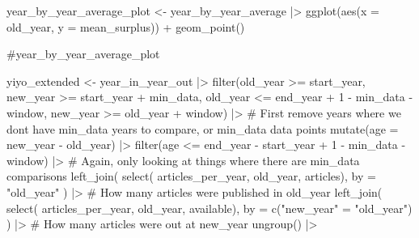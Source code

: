 \documentclass[
  10pt,
  letterpaper,
  DIV=11,
  numbers=noendperiod,
  twoside]{scrartcl}
\newenvironment{Shaded}{\begin{snugshade}}{\end{snugshade}}
\newcommand{\AttributeTok}[1]{\textcolor[rgb]{0.40,0.45,0.13}{#1}}
\newcommand{\CommentTok}[1]{\textcolor[rgb]{0.37,0.37,0.37}{#1}}
\newcommand{\DecValTok}[1]{\textcolor[rgb]{0.68,0.00,0.00}{#1}}
\newcommand{\FunctionTok}[1]{\textcolor[rgb]{0.28,0.35,0.67}{#1}}
\newcommand{\NormalTok}[1]{\textcolor[rgb]{0.00,0.23,0.31}{#1}}
\newcommand{\OtherTok}[1]{\textcolor[rgb]{0.00,0.23,0.31}{#1}}
\newcommand{\SpecialCharTok}[1]{\textcolor[rgb]{0.37,0.37,0.37}{#1}}
\newcommand{\StringTok}[1]{\textcolor[rgb]{0.13,0.47,0.30}{#1}}
\begin{document}
\begin{Shaded}
\begin{Highlighting}[]
\NormalTok{year\_by\_year\_average\_plot }\OtherTok{\textless{}{-}}\NormalTok{ year\_by\_year\_average }\SpecialCharTok{|\textgreater{}}
  \FunctionTok{ggplot}\NormalTok{(}\FunctionTok{aes}\NormalTok{(}\AttributeTok{x =}\NormalTok{ old\_year, }\AttributeTok{y =}\NormalTok{ mean\_surplus)) }\SpecialCharTok{+}
  \FunctionTok{geom\_point}\NormalTok{()}

\CommentTok{\#year\_by\_year\_average\_plot}

\NormalTok{yiyo\_extended }\OtherTok{\textless{}{-}}\NormalTok{ year\_in\_year\_out }\SpecialCharTok{|\textgreater{}}
  \FunctionTok{filter}\NormalTok{(old\_year }\SpecialCharTok{\textgreater{}=}\NormalTok{ start\_year,}
\NormalTok{         new\_year }\SpecialCharTok{\textgreater{}=}\NormalTok{ start\_year }\SpecialCharTok{+}\NormalTok{ min\_data,}
\NormalTok{         old\_year }\SpecialCharTok{\textless{}=}\NormalTok{ end\_year }\SpecialCharTok{+} \DecValTok{1} \SpecialCharTok{{-}}\NormalTok{ min\_data }\SpecialCharTok{{-}}\NormalTok{ window,}
\NormalTok{         new\_year }\SpecialCharTok{\textgreater{}=}\NormalTok{ old\_year }\SpecialCharTok{+}\NormalTok{ window) }\SpecialCharTok{|\textgreater{}} \CommentTok{\# First remove years where we don\textquotesingle{}t have min\_data years to compare, or min\_data data points}
  \FunctionTok{mutate}\NormalTok{(}\AttributeTok{age =}\NormalTok{ new\_year }\SpecialCharTok{{-}}\NormalTok{ old\_year) }\SpecialCharTok{|\textgreater{}}
  \FunctionTok{filter}\NormalTok{(age }\SpecialCharTok{\textless{}=}\NormalTok{ end\_year }\SpecialCharTok{{-}}\NormalTok{ start\_year }\SpecialCharTok{+} \DecValTok{1} \SpecialCharTok{{-}}\NormalTok{ min\_data }\SpecialCharTok{{-}}\NormalTok{ window) }\SpecialCharTok{|\textgreater{}} \CommentTok{\# Again, only looking at things where there are min\_data comparisons}
  \FunctionTok{left\_join}\NormalTok{(}
    \FunctionTok{select}\NormalTok{(}
\NormalTok{      articles\_per\_year, }
\NormalTok{      old\_year,}
\NormalTok{      articles),}
    \AttributeTok{by =} \StringTok{"old\_year"} 
\NormalTok{    ) }\SpecialCharTok{|\textgreater{}} \CommentTok{\# How many articles were published in old\_year  }
  \FunctionTok{left\_join}\NormalTok{(}
    \FunctionTok{select}\NormalTok{(}
\NormalTok{      articles\_per\_year, }
\NormalTok{      old\_year,}
\NormalTok{      available),}
    \AttributeTok{by =} \FunctionTok{c}\NormalTok{(}\StringTok{"new\_year"} \OtherTok{=} \StringTok{"old\_year"}\NormalTok{)}
\NormalTok{    ) }\SpecialCharTok{|\textgreater{}} \CommentTok{\# How many articles were out at new\_year}
  \FunctionTok{ungroup}\NormalTok{() }\SpecialCharTok{|\textgreater{}}

\end{Highlighting}
\end{Shaded}
\end{document}
